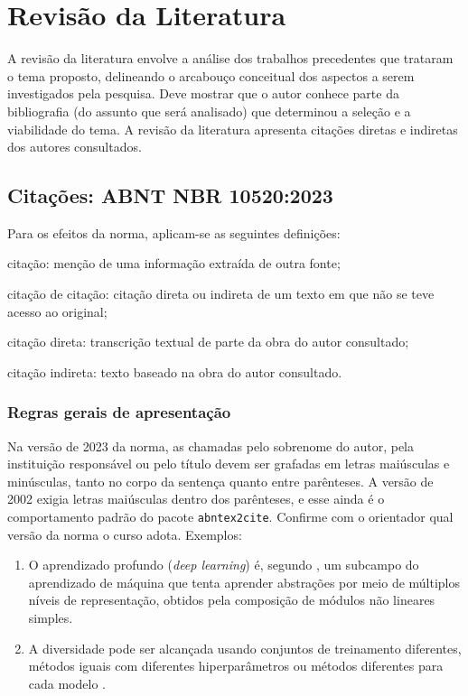 \chapter{Revisão da Literatura}
\label{cap2_revisao}

A revisão da literatura envolve a análise dos trabalhos precedentes que trataram o tema proposto, delineando o arcabouço conceitual dos aspectos a serem investigados pela pesquisa. Deve mostrar que o autor conhece parte da bibliografia (do assunto que será analisado) que determinou a seleção e a viabilidade do tema. A revisão da literatura apresenta citações diretas e indiretas dos autores consultados.

\section{Citações: ABNT NBR 10520:2023}

Para os efeitos da norma, aplicam-se as seguintes definições:

\begin{alineas}
	\item citação: menção de uma informação extraída de outra fonte;
	\item citação de citação: citação direta ou indireta de um texto em que não se teve acesso ao original;
	\item citação direta: transcrição textual de parte da obra do autor consultado;
	\item citação indireta: texto baseado na obra do autor consultado.
\end{alineas}

\subsection{Regras gerais de apresentação}

Na versão de 2023 da norma, as chamadas pelo sobrenome do autor, pela instituição responsável ou pelo título devem ser grafadas em letras maiúsculas e minúsculas, tanto no corpo da sentença quanto entre parênteses. A versão de 2002 exigia letras maiúsculas dentro dos parênteses, e esse ainda é o comportamento padrão do pacote \texttt{abntex2cite}. Confirme com o orientador qual versão da norma o curso adota. Exemplos:

\begin{enumerate}
	\item O aprendizado profundo (\textit{deep learning}) é, segundo , um subcampo do aprendizado de máquina que tenta aprender abstrações por meio de múltiplos níveis de representação, obtidos pela composição de módulos não lineares simples.
	\item A diversidade pode ser alcançada usando conjuntos de treinamento diferentes, métodos iguais com diferentes hiperparâmetros ou métodos diferentes para cada modelo \cite{Polikar2012EnsembleLearning}.
\end{enumerate}

